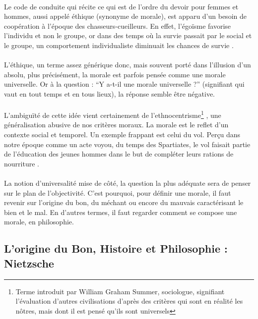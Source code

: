 \documentclass[10pt, french, a4paper]{report}
\begin{document}
\paragraph{}
Le code de conduite qui récite ce qui est de l’ordre du devoir pour femmes et hommes, aussi appelé éthique (synonyme de morale), est apparu d’un besoin de coopération à l’époque des chasseurs-cueilleurs. En effet, l’égoïsme favorise l’individu et non le groupe, or dans des temps où la survie passait par le social et le groupe, un comportement individualiste diminuait les chances de survie \citep{harari_sapiens:_2015}.

\paragraph{}
L'éthique, un terme assez générique donc, mais souvent porté dans l’illusion d’un absolu, plus précisément, la morale est parfois pensée comme une morale universelle. Or à la question : ``Y a-t-il une morale universelle ?'' (signifiant qui vaut en tout temps et en tous lieux), la réponse semble être négative.

\paragraph{}
L’ambiguïté de cette idée vient certainement de l’ethnocentrisme\footnote{Terme introduit par William Graham Summer, sociologue, signifiant l’évaluation d’autres civilisations d’après des critères qui sont en réalité les nôtres, mais dont il est pensé qu’ils sont universels} \citep{sumner_folkways_1906}, une généralisation abusive de nos critères moraux. La morale est le reflet d’un contexte social et temporel. Un exemple frappant est celui du vol. Perçu dans notre époque comme un acte voyou, du temps des Spartiates, le vol faisait partie de l’éducation des jeunes hommes dans le but de compléter leurs rations de nourriture \citep{ducat_du_2017}.

\paragraph{}
La notion d’universalité mise de côté, la question la plus adéquate sera de penser sur le plan de l’objectivité. C'est pourquoi, pour définir une morale, il faut revenir sur l'origine du bon, du méchant ou encore du mauvais caractérisant le bien et le mal. En d'autres termes, il faut regarder comment se compose une morale, en philosophie.

\subsection{L'origine du Bon, Histoire et Philosophie : Nietzsche}
\label{subsec:ethique_origine_bon}
\end{document}
